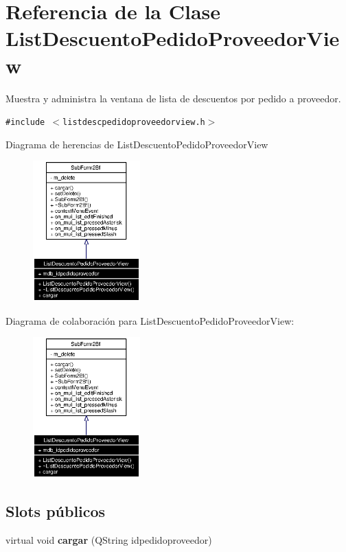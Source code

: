\section{Referencia de la Clase List\-Descuento\-Pedido\-Proveedor\-View}
\label{classListDescuentoPedidoProveedorView}
Muestra y administra la ventana de lista de descuentos por pedido a proveedor.  


{\tt \#include $<$listdescpedidoproveedorview.h$>$}

Diagrama de herencias de List\-Descuento\-Pedido\-Proveedor\-View\begin{figure}[H]
\begin{center}
\leavevmode
\includegraphics[width=117pt]{classListDescuentoPedidoProveedorView__inherit__graph}
\end{center}
\end{figure}
Diagrama de colaboraci\'{o}n para List\-Descuento\-Pedido\-Proveedor\-View:\begin{figure}[H]
\begin{center}
\leavevmode
\includegraphics[width=117pt]{classListDescuentoPedidoProveedorView__coll__graph}
\end{center}
\end{figure}
\subsection*{Slots p\'{u}blicos}
\begin{CompactItemize}
\item 
virtual void {\bf cargar} (QString idpedidoproveedor)\label{classListDescuentoPedidoProveedorView_i0}

\end{CompactItemize}
